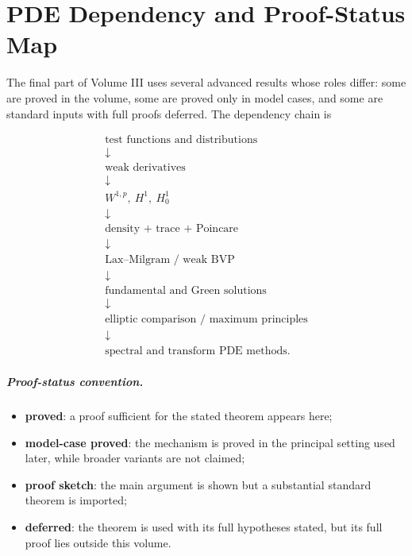 \chapter*{PDE Dependency and Proof-Status Map}
\label{front:vol03-pde-dependency-map}

The final part of Volume III uses several advanced results whose roles differ:
some are proved in the volume, some are proved only in model cases, and some
are standard inputs with full proofs deferred. The dependency chain is

\[
\boxed{
\begin{array}{c}
\text{test functions and distributions}
\\ \downarrow \\
\text{weak derivatives}
\\ \downarrow \\
W^{1,p},\ H^1,\ H_0^1
\\ \downarrow \\
\text{density + trace + Poincare}
\\ \downarrow \\
\text{Lax--Milgram / weak BVP}
\\ \downarrow \\
\text{fundamental and Green solutions}
\\ \downarrow \\
\text{elliptic comparison / maximum principles}
\\ \downarrow \\
\text{spectral and transform PDE methods}.
\end{array}}
\]

\paragraph{Proof-status convention.}
\begin{itemize}
\item \textbf{proved}: a proof sufficient for the stated theorem appears here;
\item \textbf{model-case proved}: the mechanism is proved in the principal
setting used later, while broader variants are not claimed;
\item \textbf{proof sketch}: the main argument is shown but a substantial
standard theorem is imported;
\item \textbf{deferred}: the theorem is used with its full hypotheses stated,
but its full proof lies outside this volume.
\end{itemize}

